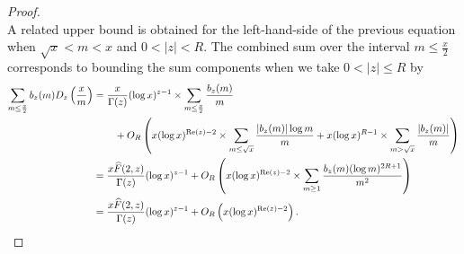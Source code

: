 \documentclass[11pt,reqno,a4letter]{article}
\numberwithin{figure}{section}
\numberwithin{table}{section}
\theoremstyle{plain}
\numberwithin{theorem}{section}
\theoremstyle{definition}
\renewcommand{\Re}{\operatorname{Re}}
\begin{document}
\begin{proof}
\[\]
A related upper bound is obtained for the left-hand-side of the previous equation when 
$\sqrt{x} < m < x$ and $0 < |z| < R$. 
The combined sum over the interval $m \leq \frac{x}{2}$ corresponds to bounding the 
sum components when we take $0 < |z| \leq R$ by 
\begin{align*} 
\sum_{m \leq \frac{x}{2}} b_z(m) D_z\left(\frac{x}{m}\right) & = \frac{x}{\Gamma(z)} (\log x)^{z-1} \times 
     \sum_{m \leq \frac{x}{2}} \frac{b_z(m)}{m} \\ 
     & \phantom{=\quad\ } + 
     O_R\left(x (\log x)^{\Re(z)-2} \times \sum_{m \leq \sqrt{x}} \frac{|b_z(m)| \log m}{m} + 
     x (\log x)^{R-1} \times \sum_{m > \sqrt{x}} \frac{|b_z(m)|}{m}\right) \\ 
     & = \frac{x \widehat{F}(2, z)}{\Gamma(z)} (\log x)^{z-1} + O_R\left( 
     x (\log x)^{\Re(z)-2} \times \sum_{m \geq 1} \frac{b_z(m) (\log m)^{2R+1}}{m^2} 
     \right) \\ 
     & = \frac{x \widehat{F}(2, z)}{\Gamma(z)} (\log x)^{z-1} + O_{R}\left( 
     x (\log x)^{\Re(z)-2}\right). 
     \qedhere  
\end{align*} 
\end{proof} 
\end{document}
